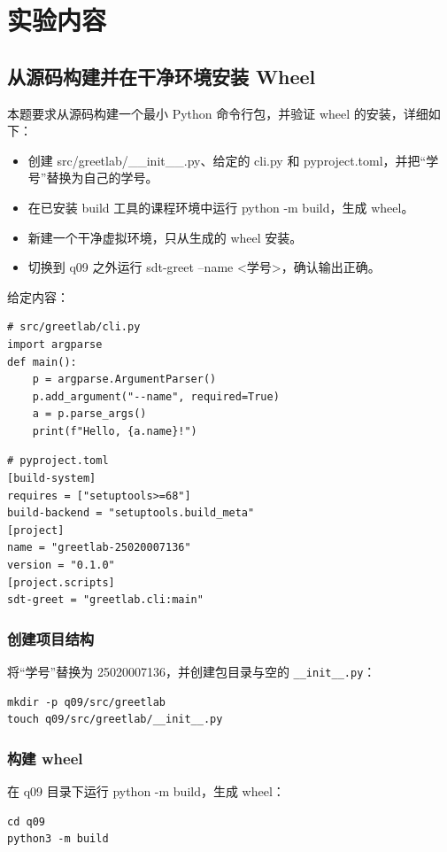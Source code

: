 \section{实验内容}

\subsection{从源码构建并在干净环境安装 Wheel}
本题要求从源码构建一个最小 Python 命令行包，并验证 wheel 的安装，详细如下：
\begin{itemize}
    \item 创建 src/greetlab/\_\_init\_\_.py、给定的 cli.py 和 pyproject.toml，并把“学号”替换为自己的学号。
    \item 在已安装 build 工具的课程环境中运行 python -m build，生成 wheel。
    \item 新建一个干净虚拟环境，只从生成的 wheel 安装。
    \item 切换到 q09 之外运行 sdt-greet --name <学号>，确认输出正确。
\end{itemize}

给定内容：
\begin{verbatim}
# src/greetlab/cli.py
import argparse
def main():
    p = argparse.ArgumentParser()
    p.add_argument("--name", required=True)
    a = p.parse_args()
    print(f"Hello, {a.name}!")
\end{verbatim}

\begin{verbatim}
# pyproject.toml
[build-system]
requires = ["setuptools>=68"]
build-backend = "setuptools.build_meta"
[project]
name = "greetlab-25020007136"
version = "0.1.0"
[project.scripts]
sdt-greet = "greetlab.cli:main"
\end{verbatim}

\subsubsection*{创建项目结构}
将“学号”替换为 25020007136，并创建包目录与空的 \texttt{\_\_init\_\_.py}：
\begin{verbatim}
mkdir -p q09/src/greetlab
touch q09/src/greetlab/__init__.py
\end{verbatim}

\subsubsection*{构建 wheel}
在 q09 目录下运行 python -m build，生成 wheel：
\begin{verbatim}
cd q09
python3 -m build
\end{verbatim}

